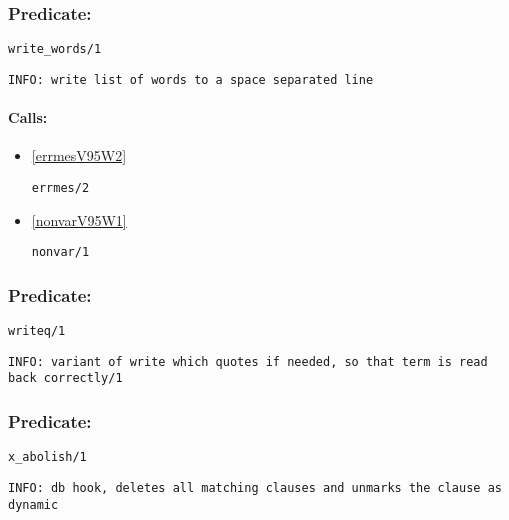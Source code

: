 \subsubsection{Predicate:} \label{writeV95WwordsV95W1}

\begin{verbatim}
write_words/1
\end{verbatim}

{\small \begin{verbatim}
INFO: write list of words to a space separated line

\end{verbatim}}
\paragraph{Calls:} 
\begin{itemize}
\item \ref{errmesV95W2} 
\begin{verbatim}
errmes/2
\end{verbatim}

\item \ref{nonvarV95W1} 
\begin{verbatim}
nonvar/1
\end{verbatim}

\end{itemize}

\subsubsection{Predicate:} \label{writeqV95W1}

\begin{verbatim}
writeq/1
\end{verbatim}

{\small \begin{verbatim}
INFO: variant of write which quotes if needed, so that term is read back correctly/1

\end{verbatim}}

\subsubsection{Predicate:} \label{xV95WabolishV95W1}

\begin{verbatim}
x_abolish/1
\end{verbatim}

{\small \begin{verbatim}
INFO: db hook, deletes all matching clauses and unmarks the clause as dynamic

\end{verbatim}}
